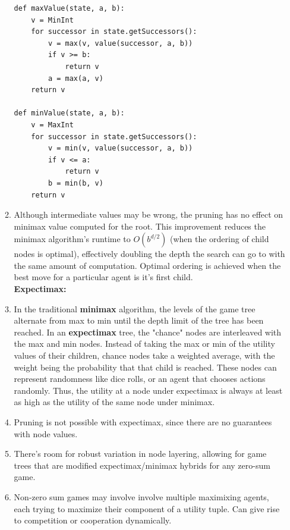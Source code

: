 \documentclass[10pt]{article}
\begin{document}
\begin{multicols}{2}
\begin{enumerate}
\begin{enumerate}
\begin{verbatim}
def maxValue(state, a, b):
    v = MinInt
    for successor in state.getSuccessors():
        v = max(v, value(successor, a, b))
        if v >= b:
            return v
        a = max(a, v)
    return v

def minValue(state, a, b):
    v = MaxInt
    for successor in state.getSuccessors():
        v = min(v, value(successor, a, b))
        if v <= a:
            return v
        b = min(b, v)
    return v
        \end{verbatim}
         \item Although intermediate values may be wrong, the pruning has no effect on minimax value computed for the root. This improvement reduces the minimax algorithm's runtime to $O(b^{d/2})$ (when the ordering of child nodes is optimal), effectively doubling the depth the search can go to with the same amount of computation. Optimal ordering is achieved when the best move for a particular agent is it's first child. \\[8 pt]
         \textbf{Expectimax:}
         \item In the traditional \textbf{minimax} algorithm, the levels of the game tree alternate from max to min until the depth limit of the tree has been reached. In an \textbf{expectimax} tree, the "chance" nodes are interleaved with the max and min nodes. Instead of taking the max or min of the utility values of their children, chance nodes take a weighted average, with the weight being the probability that that child is reached. These nodes can represent randomness like dice rolls, or an agent that chooses actions randomly. Thus, the utility at a node under expectimax is always at least as high as the utility of the same node under minimax.
         \item Pruning is not possible with expectimax, since there are no guarantees with node values.
         \item There’s room for robust variation in node layering, allowing for game trees that are modified expectimax/minimax hybrids for any zero-sum game.
         \item Non-zero sum games may involve involve multiple maximixing agents, each trying to maximize their component of a utility tuple. Can give rise to competition or cooperation dynamically.
    \end{enumerate}

\end{enumerate}
\end{multicols}
\end{document}
